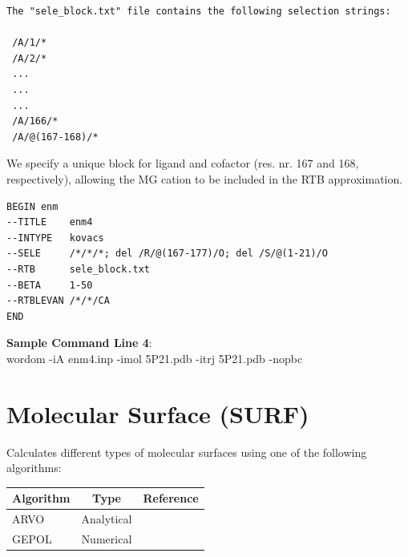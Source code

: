 \documentclass[11pt,twoside,onecolumn,a4paper,openright,notitlepage]{book}[2001/04/21]
\begin{document}
\begin{verbatim}
The "sele_block.txt" file contains the following selection strings:

 /A/1/*
 /A/2/*
 ...
 ...
 ...
 /A/166/*
 /A/@(167-168)/*

\end{verbatim}
We specify a unique block for ligand and cofactor (res. nr. 167 and 168, respectively), allowing the MG cation to be included in the RTB approximation.

\begin{verbatim}
BEGIN enm
--TITLE    enm4
--INTYPE   kovacs
--SELE     /*/*/*; del /R/@(167-177)/O; del /S/@(1-21)/O
--RTB      sele_block.txt
--BETA     1-50
--RTBLEVAN /*/*/CA
END
\end{verbatim}


\textbf{\large Sample Command Line 4}:\\
\textsf{\large wordom -iA enm4.inp -imol 5P21.pdb -itrj 5P21.pdb -nopbc}

\clearpage{}


\section{Molecular Surface (SURF)}
Calculates different types of molecular surfaces using one of the following algorithms:\\

\begin{tabular}{l|c|c}
Algorithm & Type & Reference\\
\hline
ARVO  & Analytical & \cite{buvsa2005afp}\\
GEPOL & Numerical  & \cite{pascualahuir1994gid}\\
\end{tabular}\\\\
\end{document}
